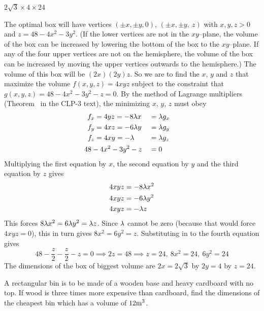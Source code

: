 
\begin{answer}
$2\sqrt{3} \times 4\times 24$
\end{answer}

\begin{solution}
The optimal box will have vertices $(\pm x,\pm y, 0)$,
$(\pm x,\pm y,\ z)$ with $x,y,z>0$ and $z=48-4x^2-3y^2$. (If the lower
vertices are not in the $xy$--plane, the volume of the box can be increased
by lowering the bottom of the box to the $xy$--plane. If any of the four 
upper vertices are not on the hemisphere, the volume of the box can be 
increased by moving the upper vertices outwards to the hemisphere.)  
The volume of this box will be $(2x)(2y)z$. 
So we are to find the $x$, $y$ and $z$ that maximize the volume
$f(x,y,z)=4xyz$ subject to the constraint that 
$g(x,y,z)=48-4x^2-3y^2-z =0$. By the method of
Lagrange multipliers (Theorem~ in the CLP-3 text),
the minimizing $x$, $y$, $z$ must obey
\begin{alignat*}{3}
f_x&=4yz=-8\la x&&=\la g_x\cr
f_y&=4xz=-6\la y&&=\la g_y\cr
f_z&=4xy=-\la&&=\la g_z\cr
&\hskip-0.2in 48-4x^2-3y^2-z&&=0
\end{alignat*}
Multiplying the first equation by $x$, the second equation by $y$ 
and the third equation by $z$  gives
\begin{align*}
4xyz&=-8\lambda x^2 \\
4xyz&=-6\lambda y^2 \\
4xyz&=-\lambda z
\end{align*}
This forces $8\lambda x^2=6\lambda y^2=\lambda z$. Since $\lambda$ cannot be zero (because
that would force $4xyz=0$), this in turn gives $8 x^2=6 y^2= z$. Substituting
in to the fourth equation gives
\begin{equation*}
48 -\frac{z}{2}-\frac{z}{2}-z=0\implies 2z=48\implies z=24,\ 8x^2=24,\
6y^2=24
\end{equation*}
The dimensions of the box of biggest volume are 
$2x=2\sqrt{3}$ by $2y=4$ by $z=24$.
\end{solution}

\begin{question}[M200 2001D] %
A rectangular bin is to be made of a wooden base and
heavy cardboard with no top. If wood is three times more expensive than
cardboard, find the dimensions of the cheapest bin which has a volume
of $12{\rm m}^3$.
\end{question}

